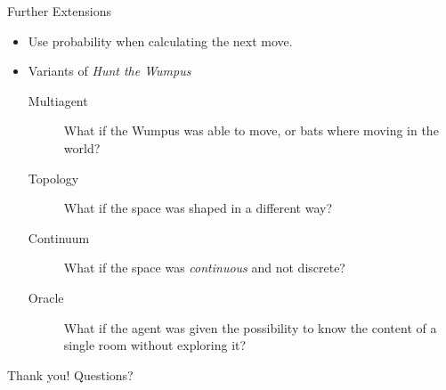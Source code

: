 \documentclass[smaller,dvipsnames,ratio=169,10pt]{beamer}
\newcommand{\htw}{\emph{Hunt the Wumpus}\xspace}
\begin{document}
  \begin{frame}{Further Extensions}
  
  	\begin{itemize}
	  	 \item Use probability when calculating the next move.
		 \item Variants of \htw
  	  \begin{description}
  		\item[Multiagent]{What if the Wumpus was able to move, or bats where moving in the world?}
	  	\item[Topology]{What if the space was shaped in a different way?}
	  	\item[Continuum]{What if the space was \emph{continuous} and not discrete?}
	  	\item[Oracle]{What if the agent was given the possibility to know the content of a single room without exploring it?}
  	  \end{description}
  	\end{itemize}
  \end{frame}

  \begin{frame}[standout]
    Thank you! Questions?
  \end{frame}
\end{document}
